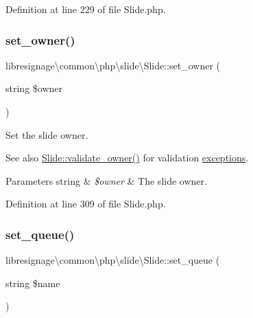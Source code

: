 Definition at line 229 of file Slide.\+php.

\mbox{\label{classlibresignage_1_1common_1_1php_1_1slide_1_1Slide_a04d9f34445019f283a2cf78cbdd4ff6f}} 
\subsubsection{\texorpdfstring{set\+\_\+owner()}{set\_owner()}}
{\footnotesize\ttfamily libresignage\textbackslash{}common\textbackslash{}php\textbackslash{}slide\textbackslash{}\+Slide\+::set\+\_\+owner (\begin{DoxyParamCaption}\item[{string}]{\$owner }\end{DoxyParamCaption})}

Set the slide owner.

\begin{DoxySeeAlso}{See also}
\hyperlink{classlibresignage_1_1common_1_1php_1_1slide_1_1Slide_a7e32cde7136c18a7150381650b6758a6}{Slide\+::validate\+\_\+owner()} for validation \hyperlink{namespacelibresignage_1_1common_1_1php_1_1slide_1_1exceptions}{exceptions}.
\end{DoxySeeAlso}

\begin{DoxyParams}[1]{Parameters}
string & {\em \$owner} & The slide owner. \\
\hline
\end{DoxyParams}


Definition at line 309 of file Slide.\+php.

\mbox{\label{classlibresignage_1_1common_1_1php_1_1slide_1_1Slide_a1868fb299bad4a5e0f7202083d0b8b05}} 
\subsubsection{\texorpdfstring{set\+\_\+queue()}{set\_queue()}}
{\footnotesize\ttfamily libresignage\textbackslash{}common\textbackslash{}php\textbackslash{}slide\textbackslash{}\+Slide\+::set\+\_\+queue (\begin{DoxyParamCaption}\item[{string}]{\$name }\end{DoxyParamCaption})}

